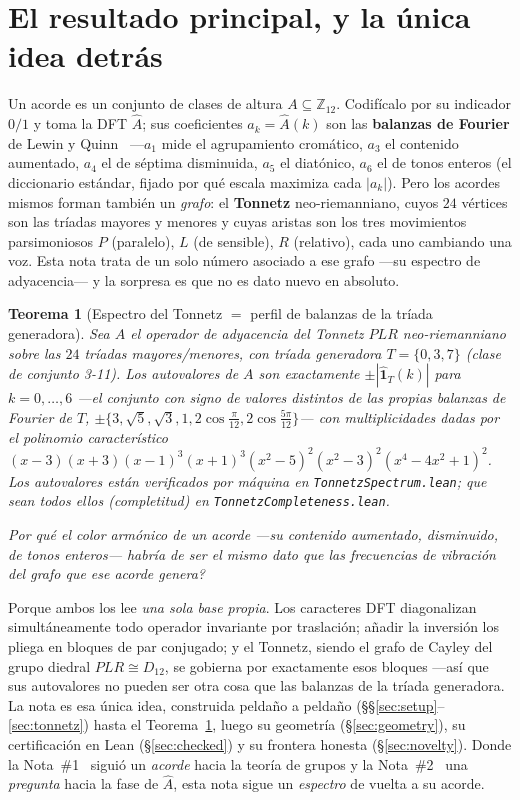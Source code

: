\documentclass[11pt]{article}
\newtheorem{theorem}{Teorema}
\newcommand{\lean}[1]{\texttt{#1}}
\newcommand{\Ztwelve}{\mathbb{Z}_{12}}
\newcommand{\Ahat}{\hat{A}}
\newcommand{\question}[1]{\smallskip\noindent\textit{#1}\smallskip}
\begin{document}
\section{El resultado principal, y la \'unica idea detr\'as}\label{sec:hook}

Un acorde es un conjunto de clases de altura $A\subseteq\Ztwelve$. Codif\'icalo por su indicador $0/1$ y toma
la DFT $\Ahat$; sus coeficientes $a_k=\Ahat(k)$ son las \textbf{balanzas de Fourier} de Lewin y
Quinn~\cite{Quinn} ---$a_1$ mide el agrupamiento crom\'atico, $a_3$ el contenido aumentado, $a_4$ el de
s\'eptima disminuida, $a_5$ el diat\'onico, $a_6$ el de tonos enteros (el diccionario est\'andar, fijado por
qu\'e escala maximiza cada $|a_k|$). Pero los acordes mismos forman tambi\'en un \emph{grafo}: el
\textbf{Tonnetz} neo-riemanniano, cuyos $24$ v\'ertices son las tr\'iadas mayores y menores y cuyas aristas
son los tres movimientos parsimoniosos $P$ (paralelo), $L$ (de sensible), $R$ (relativo), cada uno cambiando
una voz. Esta nota trata de un solo n\'umero asociado a ese grafo ---su espectro de adyacencia--- y la
sorpresa es que no es dato nuevo en absoluto.

\begin{theorem}[Espectro del Tonnetz $=$ perfil de balanzas de la tr\'iada generadora]\label{thm:main}
Sea $A$ el operador de adyacencia del Tonnetz $PLR$ neo-riemanniano sobre las $24$ tr\'iadas mayores/menores,
con tr\'iada generadora $T=\{0,3,7\}$ (clase de conjunto 3-11). Los autovalores de $A$ son exactamente
$\pm|\hat{\mathbf 1}_T(k)|$ para $k=0,\dots,6$ ---el conjunto con signo de valores distintos de las propias balanzas de
Fourier de $T$, $\pm\{3,\sqrt5,\sqrt3,1,2\cos\tfrac{\pi}{12},2\cos\tfrac{5\pi}{12}\}$--- con multiplicidades
dadas por el polinomio caracter\'istico $(x-3)(x+3)(x-1)^3(x+1)^3(x^2-5)^2(x^2-3)^2(x^4-4x^2+1)^2$. Los
autovalores est\'an verificados por m\'aquina en \lean{TonnetzSpectrum.lean}; que sean \emph{todos} ellos
(completitud) en \lean{TonnetzCompleteness.lean}.
\end{theorem}

\question{\textquestiondown Por qu\'e el color arm\'onico de un acorde ---su contenido aumentado, disminuido,
de tonos enteros--- habr\'ia de ser el mismo dato que las frecuencias de vibraci\'on del grafo que ese acorde
genera?}

\noindent Porque ambos los lee \emph{una sola base propia}. Los caracteres DFT diagonalizan simult\'aneamente
todo operador invariante por traslaci\'on; a\~nadir la inversi\'on los pliega en bloques de par conjugado; y
el Tonnetz, siendo el grafo de Cayley del grupo diedral $PLR\cong D_{12}$, se gobierna por exactamente esos
bloques ---as\'i que sus autovalores no pueden ser otra cosa que las balanzas de la tr\'iada generadora. La
nota es esa \'unica idea, construida pelda\~no a pelda\~no (\S\S\ref{sec:setup}--\ref{sec:tonnetz}) hasta el
Teorema~\ref{thm:main}, luego su geometr\'ia (\S\ref{sec:geometry}), su certificaci\'on en Lean
(\S\ref{sec:checked}) y su frontera honesta (\S\ref{sec:novelty}). Donde la Nota~\#1~\cite{Note1} sigui\'o un
\emph{acorde} hacia la teor\'ia de grupos y la Nota~\#2~\cite{Note2} una \emph{pregunta} hacia la fase de
$\Ahat$, esta nota sigue un \emph{espectro} de vuelta a su acorde.
\end{document}
